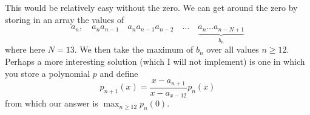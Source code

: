 This would be relatively easy without the zero. We can get around the zero by storing in an array the values of
$$a_n, \quad a_na_{n-1}\quad a_na_{n-1}a_{n-2} \quad\dots\quad \underbrace{a_n\dots a_{n-N+1}}_{b_n}$$
where here $N=13$. We then take the maximum of $b_n$ over all values $n\ge 12$. Perhaps a more interesting solution 
(which I will not implement) is one in which you store a polynomial $p$ and define
$$p_{n+1}(x)=\frac{x-a_{n+1}}{x-a_{x-12}}p_n(x)$$
from which our answer is $\max_{n\ge 12} p_n(0)$.